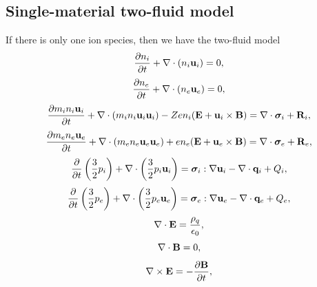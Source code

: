 \documentclass[a4paper,11pt]{report}
\begin{document}
\subsection{Single-material two-fluid model}
If there is only one ion species, then we have the two-fluid model
\label{sec:mf_2fluid_equations}
\begin{equation}
    \label{eq:mf_2fluid_ni}
    \frac{\partial n_i}{\partial t} + \nabla \cdot \left ( n_i \mathbf{u}_i \right ) = 0,
\end{equation}
\begin{equation}
    \label{eq:mf_2fluid_ne}
    \frac{\partial n_e}{\partial t} + \nabla \cdot \left ( n_e \mathbf{u}_e \right ) = 0,
\end{equation}
\begin{equation}
    \label{eq:mf_2fluid_ui}
    \frac{\partial m_i n_i \mathbf{u}_i}{\partial t} + \nabla \cdot \left ( m_i n_i \mathbf{u}_i \mathbf{u}_i \right) - Z e n_i ( \mathbf{E} + \mathbf{u}_i \times \mathbf{B} ) = \nabla \cdot \bm \sigma_i + \mathbf{R}_i,
\end{equation}
\begin{equation}
    \label{eq:mf_2fluid_ue}
    \frac{\partial m_e n_e \mathbf{u}_e}{\partial t} + \nabla \cdot \left ( m_e n_e \mathbf{u}_e \mathbf{u}_e \right) + e n_e ( \mathbf{E} + \mathbf{u}_e \times \mathbf{B} ) = \nabla \cdot \bm \sigma_e + \mathbf{R}_e,
\end{equation}
\begin{equation}
    \label{eq:mf_2fluid_iei}
    \frac{\partial}{\partial t} \left ( \frac{3}{2} p_i \right ) + \nabla \cdot \left ( \frac{3}{2} p_i \mathbf{u}_i \right ) = \bm \sigma_i : \nabla \mathbf{u}_i - \nabla \cdot \mathbf{q}_i + Q_i,
\end{equation}
\begin{equation}
    \label{eq:mf_2fluid_iee}
    \frac{\partial}{\partial t} \left ( \frac{3}{2} p_e \right ) + \nabla \cdot \left ( \frac{3}{2} p_e \mathbf{u}_e \right ) = \bm \sigma_e : \nabla \mathbf{u}_e - \nabla \cdot \mathbf{q}_e + Q_e,
\end{equation}
\begin{equation}
    \label{eq:mf_2fluid_maxwell_3}
    \nabla \cdot \mathbf{E} = \frac{\rho_q}{\epsilon_0},
\end{equation}
\begin{equation}
    \label{eq:mf_2fluid_maxwell_4}
    \nabla \cdot \mathbf{B} = 0,
\end{equation}
\begin{equation}
    \label{eq:mf_2fluid_maxwell_1}
    \nabla \times \mathbf{E} = -\frac{ \partial \mathbf{B}}{\partial t},
\end{equation}
\end{document}
